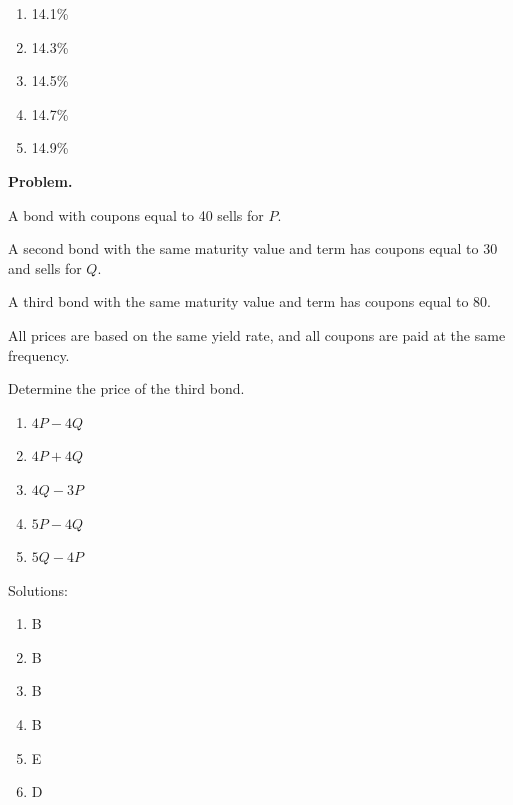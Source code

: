 \documentclass[11pt]{article}
\begin{document}
\begin{enumerate}[label=\Alph*.]
    \item 14.1\%
    \item 14.3\%
    \item 14.5\%
    \item 14.7\%
    \item 14.9\%
\end{enumerate}

\newpage

\textbf{Problem.}

A bond with coupons equal to 40 sells for $P$.

A second bond with the same maturity value and term has coupons equal to 30 and sells for $Q$.

A third bond with the same maturity value and term has coupons equal to 80.

All prices are based on the same yield rate, and all coupons are paid at the same frequency.

Determine the price of the third bond.

\begin{enumerate}[label=\Alph*.]
    \item $4P-4Q$
    \item $4P+4Q$
    \item $4Q-3P$
    \item $5P-4Q$
    \item $5Q-4P$
\end{enumerate}


\newpage

Solutions:

\begin{enumerate}
    \item B
    \item B
    \item B
    \item B
    \item E
    \item D
\end{enumerate}
\end{document}
